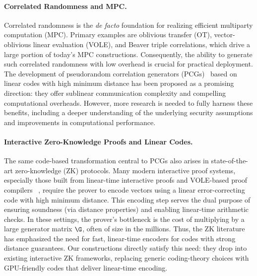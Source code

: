 \paragraph{Correlated Randomness and MPC.}
Correlated randomness is the {\it de facto} foundation for realizing efficient multiparty computation (MPC). Primary examples are oblivious transfer (OT), vector-oblivious linear evaluation (VOLE), and Beaver triple correlations, which drive a large portion of today's MPC constructions. Consequently, the ability to generate such correlated randomness with low overhead is crucial for practical deployment. The development of pseudorandom correlation generators (PCGs)~\cite{silentOTCCS,silentOTcrypto} based on linear codes with high minimum distance has been proposed as a promising direction: they offer sublinear communication complexity and compelling computational overheads. However, more research is needed to fully harness these benefits, including a deeper understanding of the underlying security assumptions and improvements in computational performance.


\paragraph{Interactive Zero-Knowledge Proofs and Linear Codes.}
The same code-based transformation central to PCGs also arises in state-of-the-art zero-knowledge (ZK) protocols. Many modern interactive proof systems, especially those built from linear-time interactive proofs and VOLE-based proof compilers~\cite{wolverine} \cite{ferret}, require the prover to encode vectors using a linear error-correcting code with high minimum distance. This encoding step serves the dual purpose of ensuring soundness (via distance properties) and enabling linear-time arithmetic checks. In these settings, the prover's bottleneck is the cost of multiplying by a large generator matrix $\G$, often of size in the millions. Thus, the ZK literature has emphasized the need for fast, linear-time encoders for codes with strong distance guarantees. Our constructions directly satisfy this need: they drop into existing interactive ZK frameworks, replacing generic coding-theory choices with GPU-friendly codes that deliver linear-time encoding.

